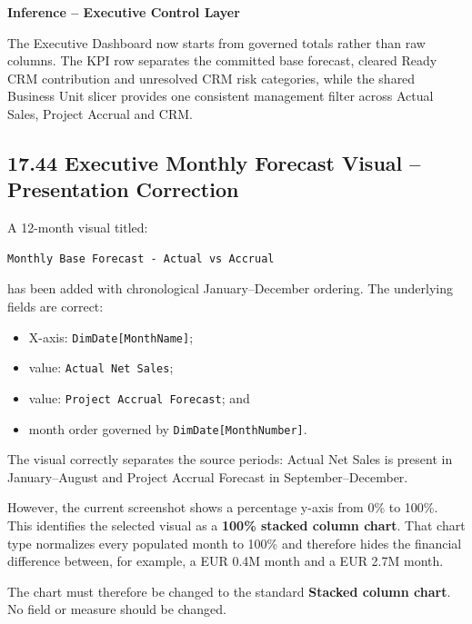 \documentclass[11pt,a4paper]{article}
\begin{document}
\begin{inferencebox}

\textbf{Inference -- Executive Control Layer}

The Executive Dashboard now starts from governed totals rather than raw columns.
The KPI row separates the committed base forecast, cleared Ready CRM contribution
and unresolved CRM risk categories, while the shared Business Unit slicer provides
one consistent management filter across Actual Sales, Project Accrual and CRM.

\end{inferencebox}


\subsection{17.44 Executive Monthly Forecast Visual -- Presentation Correction}

A 12-month visual titled:

\begin{lstlisting}[style=powerquery]
Monthly Base Forecast - Actual vs Accrual
\end{lstlisting}

has been added with chronological January--December ordering. The underlying
fields are correct:

\begin{itemize}[leftmargin=7mm,itemsep=2pt]
    \item X-axis: \texttt{DimDate[MonthName]};
    \item value: \texttt{Actual Net Sales};
    \item value: \texttt{Project Accrual Forecast}; and
    \item month order governed by \texttt{DimDate[MonthNumber]}.
\end{itemize}

The visual correctly separates the source periods: Actual Net Sales is present in
January--August and Project Accrual Forecast in September--December.

However, the current screenshot shows a percentage y-axis from 0\% to 100\%.
This identifies the selected visual as a \textbf{100\% stacked column chart}.
That chart type normalizes every populated month to 100\% and therefore hides the
financial difference between, for example, a EUR 0.4M month and a EUR 2.7M month.

The chart must therefore be changed to the standard
\textbf{Stacked column chart}. No field or measure should be changed.
\end{document}
